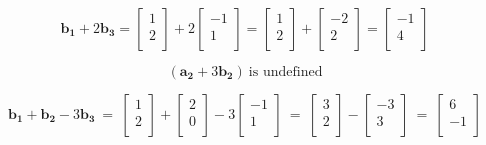 \documentclass{article}
\begin{document}
\[
    \mathbf{b_1} 
    +
    2 \mathbf{b_3} 
    =     
    \begin{bmatrix}
        1 \\ 2 \\
    \end{bmatrix}
    +
    2
    \begin{bmatrix}
        -1 \\ 1 \\
    \end{bmatrix}
    =
    \begin{bmatrix}
        1 \\ 2 \\
    \end{bmatrix}
    +
    \begin{bmatrix}
        -2 \\ 2 \\
    \end{bmatrix}
    =
    \begin{bmatrix}
        -1 \\ 4 \\
    \end{bmatrix}
\]


\[
(\mathbf{a_2} +
3 \mathbf{b_2}  )
\ \text{is undefined}
\]


\[
    \mathbf{b_1} +
    \mathbf{b_2} -
    3
    \mathbf{b_3} 
    \ = \
    \begin{bmatrix}
        1 \\ 2 \\
    \end{bmatrix}
    +
    \begin{bmatrix}
        2 \\ 0 \\
    \end{bmatrix}
    -
    3
    \begin{bmatrix}
        -1 \\ 1 \\
    \end{bmatrix}
    \ = \
    \begin{bmatrix}
        3 \\ 2 \\
    \end{bmatrix}
    -
    \begin{bmatrix}
        -3 \\ 3 \\
    \end{bmatrix}
    \ = \
    \begin{bmatrix}
        6 \\ -1 \\
    \end{bmatrix}
\]
\end{document}
